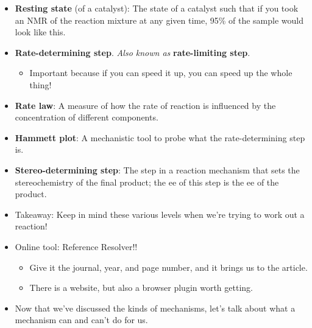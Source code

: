 \documentclass[../notes.tex]{subfiles}
\begin{document}
\begin{itemize}
\begin{enumerate}
\begin{itemize}
\begin{itemize}
                \item This is a transformation under light from a \emph{cis}-olefin to a \emph{trans}-olefin.
                \item The authors tracked the reaction with femtosecond (\num{e-15}) Raman spectroscopy.
                \item Reference: \textcite{bib:computational}.
            \end{itemize}
            \item Full computational modeling is a pipe dream that would hugely enable our work as chemists.
        \end{itemize}
    \end{enumerate}
    \item \textbf{Resting state} (of a catalyst): The state of a catalyst such that if you took an NMR of the reaction mixture at any given time, 95\% of the sample would look like this.
    \item \textbf{Rate-determining step}. \emph{Also known as} \textbf{rate-limiting step}.
    \begin{itemize}
        \item Important because if you can speed it up, you can speed up the whole thing!
    \end{itemize}
    \item \textbf{Rate law}: A measure of how the rate of reaction is influenced by the concentration of different components.
    \item \textbf{Hammett plot}: A mechanistic tool to probe what the rate-determining step is.
    \item \textbf{Stereo-determining step}: The step in a reaction mechanism that sets the stereochemistry of the final product; the ee of this step is the ee of the product.
    \item Takeaway: Keep in mind these various levels when we're trying to work out a reaction!
    \item Online tool: Reference Resolver!!
    \begin{itemize}
        \item Give it the journal, year, and page number, and it brings us to the article.
        \item There is a website, but also a browser plugin worth getting.
    \end{itemize}
    \item Now that we've discussed the kinds of mechanisms, let's talk about what a mechanism can and can't do for us.

\end{itemize}
\end{document}
